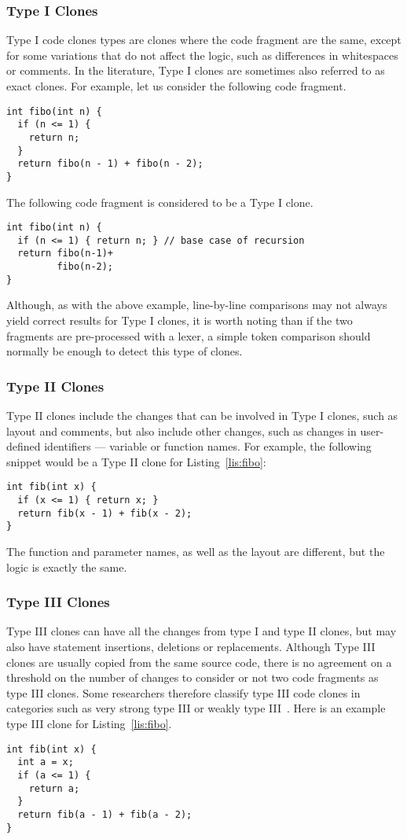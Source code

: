 \subsubsection{Type I Clones}
Type I code clones types are clones where the code fragment are the same,
except for some variations that do not affect the logic, such as differences
in whitespaces or comments. In the literature, Type I clones are sometimes also
referred to as exact clones.
For example, let us consider the following code fragment.
\begin{lstlisting}[caption=Fibonacci function,label=lis:fibo]
int fibo(int n) {
  if (n <= 1) {
    return n;
  }
  return fibo(n - 1) + fibo(n - 2);
}
\end{lstlisting}

The following code fragment is considered to be a Type I clone.
\begin{lstlisting}
int fibo(int n) {
  if (n <= 1) { return n; } // base case of recursion
  return fibo(n-1)+
         fibo(n-2);
}
\end{lstlisting}

Although, as with the above example, line-by-line comparisons may not always
yield correct results for Type I clones, it is worth noting than if the two
fragments are pre-processed with a lexer, a simple token comparison should
normally be enough to detect this type of clones.
\subsubsection{Type II Clones}
Type II clones include the changes that can be involved in Type I clones, such
as layout and comments, but also include other changes, such as changes in
user-defined identifiers --- variable or function names. For example, the
following snippet would be a Type II clone for Listing~\ref{lis:fibo}:
\begin{lstlisting}
int fib(int x) {
  if (x <= 1) { return x; }
  return fib(x - 1) + fib(x - 2);
}
\end{lstlisting}
The function and parameter names, as well as the layout are different, but the
logic is exactly the same.
\subsubsection{Type III Clones}
Type III clones can have all the changes from type I and type II clones, but
may also have statement insertions, deletions or replacements.
Although Type III clones are usually copied from the same source code,
there is no agreement on a threshold on the number of changes to consider or not
two code fragments as type III clones. Some researchers therefore classify
type III code clones in categories such as very strong type III or weakly type
III~\cite{Sajnani:2016:SSC:2884781.2884877}.
Here is an example type III clone for Listing~\ref{lis:fibo}.
%
\begin{lstlisting}
int fib(int x) {
  int a = x;
  if (a <= 1) {
    return a;
  }
  return fib(a - 1) + fib(a - 2);
}
\end{lstlisting}

